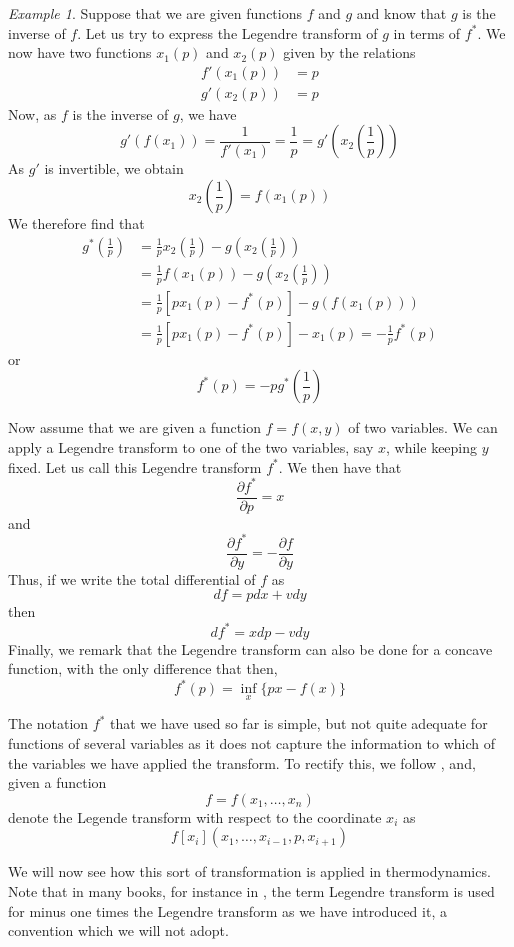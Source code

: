 \documentclass[a4paper, draft]{article}
\theoremstyle{own}
\theoremstyle{remark}
\newtheorem{example}{Example}[section]
\begin{document}
\begin{example}
Suppose that we are given functions $f$ and $g$ and know that $g$ is the inverse of $f$. Let us try to express the Legendre transform of $g$ in terms of $f^*$. We now have two functions $x_1(p)$ and $x_2(p)$ given by the relations
\begin{align*}
f'(x_1(p)) &= p \\
g'(x_2(p)) &= p
\end{align*}
Now, as $f$ is the inverse of $g$, we have
$$
g'(f(x_1)) = \frac{1}{f'(x_1)} = \frac{1}{p} = g'(x_2(\frac{1}{p}))
$$
As $g'$ is invertible, we obtain
$$
x_2(\frac{1}{p}) = f(x_1(p))
$$
We therefore find that
\begin{align*}
g^*(\frac{1}{p}) &= \frac{1}{p} x_2(\frac{1}{p}) - g(x_2(\frac{1}{p})) \\
&= \frac{1}{p} f(x_1(p)) - g(x_2(\frac{1}{p})) \\
&= \frac{1}{p}  [ p x_1(p) - f^*(p)  ] - g(f(x_1(p))) \\
&= \frac{1}{p}  [ p x_1(p) - f^*(p)  ] - x_1(p) = - \frac{1}{p} f^*(p)
\end{align*}
or
$$
f^*(p) = - p g^*(\frac{1}{p})
$$
\end{example}

Now assume that we are given a function $f = f(x,y)$ of two variables. We can apply a Legendre transform to one of the two variables, say $x$, while keeping $y$ fixed. Let us call this Legendre transform $f^*$. We then have that
$$
\frac{\partial f^*}{\partial p} = x
$$
and
$$
\frac{\partial f^*}{\partial y} = - \frac{\partial f}{\partial y}
$$
Thus, if we write the total differential of $f$ as
$$
df = p dx + v dy
$$
then
$$
df^* = x dp - v dy
$$
Finally, we remark that the Legendre transform can also be done for a concave function, with the only difference that then,
$$
f^*(p) = \inf_{x} \{ px - f(x)\}
$$

The notation $f^*$ that we have used so far is simple, but not quite adequate for functions of several variables as it does not capture the information to which of the variables we have applied the transform. To rectify this, we follow \cite{Callen}, and, given a function
$$
f = f(x_1, \dots, x_n)
$$
denote the Legende transform with respect to the coordinate $x_i$ as
$$
f[x_i](x_1, \dots, x_{i-1}, p, x_{i+1})
$$


We will now see how this sort of transformation is applied in thermodynamics. Note that in many books, for instance in \cite{Callen}, the term Legendre transform is used for minus one times the Legendre transform as we have introduced it, a convention which we will not adopt.
\end{document}
